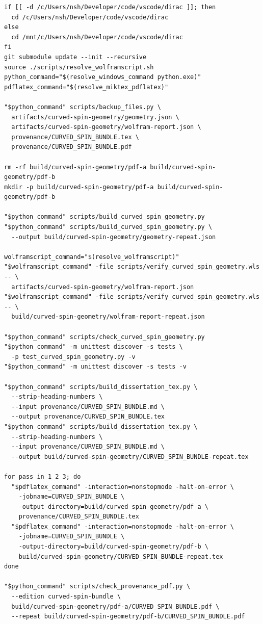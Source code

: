 \documentclass[11pt]{article}
\begin{document}
\begin{Verbatim}[fontsize=\small]
if [[ -d /c/Users/nsh/Developer/code/vscode/dirac ]]; then
  cd /c/Users/nsh/Developer/code/vscode/dirac
else
  cd /mnt/c/Users/nsh/Developer/code/vscode/dirac
fi
git submodule update --init --recursive
source ./scripts/resolve_wolframscript.sh
python_command="$(resolve_windows_command python.exe)"
pdflatex_command="$(resolve_miktex_pdflatex)"

"$python_command" scripts/backup_files.py \
  artifacts/curved-spin-geometry/geometry.json \
  artifacts/curved-spin-geometry/wolfram-report.json \
  provenance/CURVED_SPIN_BUNDLE.tex \
  provenance/CURVED_SPIN_BUNDLE.pdf

rm -rf build/curved-spin-geometry/pdf-a build/curved-spin-geometry/pdf-b
mkdir -p build/curved-spin-geometry/pdf-a build/curved-spin-geometry/pdf-b

"$python_command" scripts/build_curved_spin_geometry.py
"$python_command" scripts/build_curved_spin_geometry.py \
  --output build/curved-spin-geometry/geometry-repeat.json

wolframscript_command="$(resolve_wolframscript)"
"$wolframscript_command" -file scripts/verify_curved_spin_geometry.wls -- \
  artifacts/curved-spin-geometry/wolfram-report.json
"$wolframscript_command" -file scripts/verify_curved_spin_geometry.wls -- \
  build/curved-spin-geometry/wolfram-report-repeat.json

"$python_command" scripts/check_curved_spin_geometry.py
"$python_command" -m unittest discover -s tests \
  -p test_curved_spin_geometry.py -v
"$python_command" -m unittest discover -s tests -v

"$python_command" scripts/build_dissertation_tex.py \
  --strip-heading-numbers \
  --input provenance/CURVED_SPIN_BUNDLE.md \
  --output provenance/CURVED_SPIN_BUNDLE.tex
"$python_command" scripts/build_dissertation_tex.py \
  --strip-heading-numbers \
  --input provenance/CURVED_SPIN_BUNDLE.md \
  --output build/curved-spin-geometry/CURVED_SPIN_BUNDLE-repeat.tex

for pass in 1 2 3; do
  "$pdflatex_command" -interaction=nonstopmode -halt-on-error \
    -jobname=CURVED_SPIN_BUNDLE \
    -output-directory=build/curved-spin-geometry/pdf-a \
    provenance/CURVED_SPIN_BUNDLE.tex
  "$pdflatex_command" -interaction=nonstopmode -halt-on-error \
    -jobname=CURVED_SPIN_BUNDLE \
    -output-directory=build/curved-spin-geometry/pdf-b \
    build/curved-spin-geometry/CURVED_SPIN_BUNDLE-repeat.tex
done

"$python_command" scripts/check_provenance_pdf.py \
  --edition curved-spin-bundle \
  build/curved-spin-geometry/pdf-a/CURVED_SPIN_BUNDLE.pdf \
  --repeat build/curved-spin-geometry/pdf-b/CURVED_SPIN_BUNDLE.pdf


\end{Verbatim}
\end{document}
